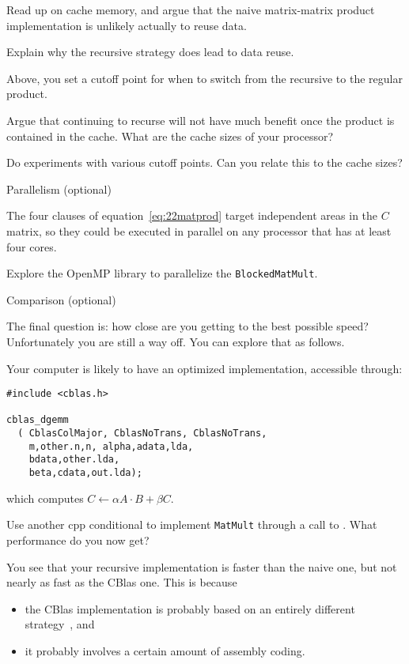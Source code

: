 \begin{exercise}
  Read up on cache memory, and argue that the naive matrix-matrix
  product implementation is unlikely actually to reuse data.

  Explain why the recursive strategy does lead to data reuse.
\end{exercise}

Above, you set a cutoff point for when to switch from the recursive to
the regular product.

\begin{exercise}
  Argue that continuing to recurse will not have much benefit once the
  product is contained in the cache. What are the cache sizes of your
  processor?

  Do experiments with various cutoff points. Can you relate this to
  the cache sizes?
\end{exercise}

 {Parallelism (optional)}

The four clauses of equation~\ref{eq:22matprod} target independent
areas in the $C$ matrix, so they could be executed in parallel on any
processor that has at least four cores.

Explore the OpenMP library to parallelize the \lstinline{BlockedMatMult}.

 {Comparison (optional)}

The final question is: how close are you getting to the best possible
speed? Unfortunately you are still a way off. You can explore that as
follows.

Your computer is likely to have an optimized implementation,
accessible through:
\begin{lstlisting}
#include <cblas.h>

cblas_dgemm
  ( CblasColMajor, CblasNoTrans, CblasNoTrans,
    m,other.n,n, alpha,adata,lda,
    bdata,other.lda,
    beta,cdata,out.lda);
\end{lstlisting}
which computes $C\leftarrow \alpha A\cdot B+\beta C$.

\begin{exercise}
  Use another cpp conditional to implement \lstinline{MatMult} through
  a call to . What performance do you now get?
\end{exercise}

You see that your recursive implementation is faster than the naive
one, but not nearly as fast as the CBlas one. This is because
\begin{itemize}
\item the CBlas implementation is probably based on an entirely
  different strategy~\cite{GotoGeijn:2008:Anatomy}, and
\item it probably involves a certain amount of assembly coding.
\end{itemize}

